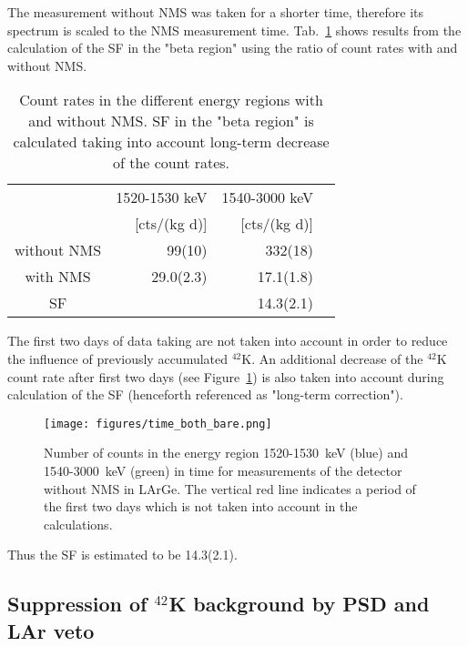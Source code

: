 \documentclass[twocolumn,epjc3]{svjour3}
\newcommand{\I}[2]{$^{#1}$#2}
\begin{document}
The measurement without NMS was taken for a shorter time, therefore its spectrum is scaled to the NMS measurement time. Tab.~\ref{tab:nms} shows results from the calculation of the SF in the "beta region" using the ratio of count rates with and without NMS.
\begin{table}
\begin{center}
\caption{\small\label{tab:nms}
Count rates in the different energy regions with and without NMS. SF in the "beta region" is calculated taking into account long-term decrease of the count rates. 
}
\begin{tabular}{crrc}
\toprule
     & 1520-1530 keV  & 1540-3000 keV\\
    &  [cts/(kg d)] & [cts/(kg d)]  \\  
\hline
 without NMS & 99(10) & 332(18)   \\
with NMS    & 29.0(2.3) & 17.1(1.8) \\
\hline
SF  &   & 14.3(2.1) \\
\bottomrule
\end{tabular}
\end{center}
\end{table}
The first two days of data taking are not taken into account in order to reduce the influence of previously accumulated \I{42}{K}. An additional decrease of the \I{42}{K} count rate after first two days (see Figure~\ref{fig:time_both_bare}) is also taken into account during calculation of the SF (henceforth referenced as "long-term correction").
%
\begin{figure}
\begin{center}
\texttt{[image: figures/time\_both\_bare.png]}
  \caption{\small\label{fig:time_both_bare}
Number of counts in the energy region 1520-1530~keV (blue) and 1540-3000~keV (green) in time for measurements of the detector without NMS in LArGe. The vertical red line indicates a period of the first two days which is not taken into account in the calculations. 
}
\end{center}
\end{figure}
% 
Thus the SF is estimated to be 14.3(2.1). 
%
\subsection{Suppression of \I{42}{K} background by PSD and LAr veto}
\label{sec:suppr42K}
\end{document}
